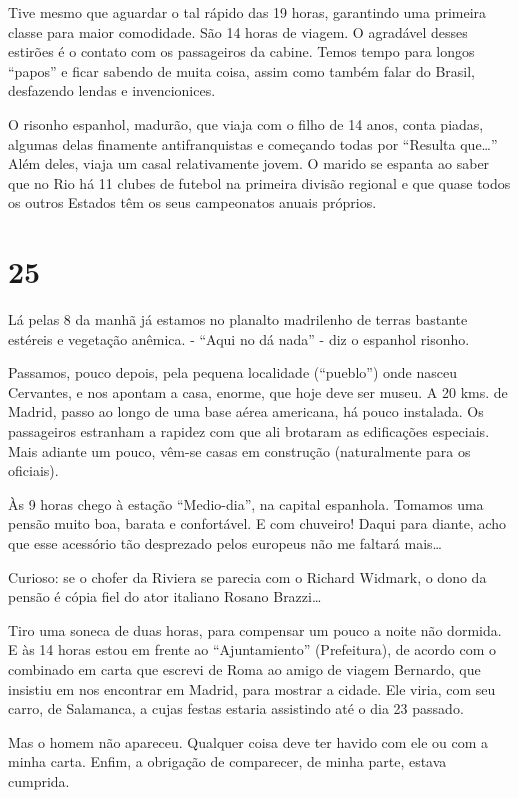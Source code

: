 Tive mesmo que aguardar o tal rápido das 19 horas, garantindo uma primeira classe para maior comodidade. São 14 horas de viagem. O agradável desses estirões é o contato com os passageiros da cabine. Temos tempo para longos ``papos'' e ficar sabendo de muita coisa, assim como também falar do Brasil, desfazendo lendas e invencionices.

O risonho espanhol, madurão, que viaja com o filho de 14 anos, conta piadas, algumas delas finamente antifranquistas e começando todas por ``Resulta que\ldots'' Além deles, viaja um casal relativamente jovem. O marido se espanta ao saber que no Rio há 11 clubes de futebol na primeira divisão regional e que quase todos os outros Estados têm os seus campeonatos anuais próprios.

\section*{25 \adfflatleafright {}}
Lá pelas 8 da manhã já estamos no planalto madrilenho de terras bastante estéreis e vegetação anêmica. - ``Aqui no dá nada'' - diz o espanhol risonho.

Passamos, pouco depois, pela pequena localidade (``pueblo'') onde nasceu Cervantes, e nos apontam a casa, enorme, que hoje deve ser museu. A 20 kms. de Madrid, passo ao longo de uma base aérea americana, há pouco instalada. Os passageiros estranham a rapidez com que ali brotaram as edificações especiais. Mais adiante um pouco, vêm-se casas em construção (naturalmente para os oficiais).

Às 9 horas chego à estação ``Medio-dia'', na capital espanhola. Tomamos uma pensão muito boa, barata e confortável. E com chuveiro! Daqui para diante, acho que esse acessório tão desprezado pelos europeus não me faltará mais\ldots

Curioso: se o chofer da Riviera se parecia com o Richard Widmark, o dono da pensão é cópia fiel do ator italiano Rosano Brazzi\ldots

Tiro uma soneca de duas horas, para compensar um pouco a noite não dormida. E às 14 horas estou em frente ao ``Ajuntamiento'' (Prefeitura), de acordo com o combinado em carta que escrevi de Roma ao amigo de viagem Bernardo, que insistiu em nos encontrar em Madrid, para mostrar a cidade. Ele viria, com seu carro, de Salamanca, a cujas festas estaria assistindo até o dia 23 passado.

Mas o homem não apareceu. Qualquer coisa deve ter havido com ele ou com a minha carta. Enfim, a obrigação de comparecer, de minha parte, estava cumprida.

